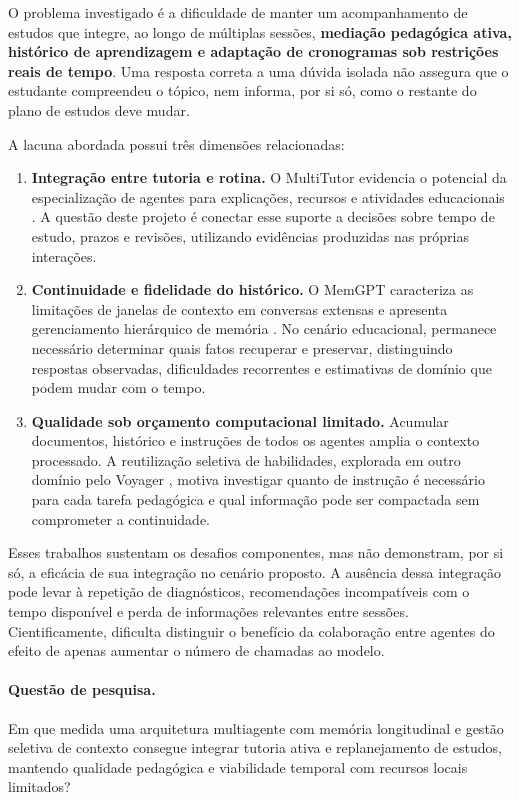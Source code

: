 \documentclass[12pt]{article}
\begin{document}
O problema investigado é a dificuldade de manter um acompanhamento de estudos que integre, ao longo de múltiplas sessões, \textbf{mediação pedagógica ativa, histórico de aprendizagem e adaptação de cronogramas sob restrições reais de tempo}. Uma resposta correta a uma dúvida isolada não assegura que o estudante compreendeu o tópico, nem informa, por si só, como o restante do plano de estudos deve mudar.

A lacuna abordada possui três dimensões relacionadas:
\begin{enumerate}
    \item \textbf{Integração entre tutoria e rotina.} O MultiTutor evidencia o potencial da especialização de agentes para explicações, recursos e atividades educacionais \citep{sun2025multitutor}. A questão deste projeto é conectar esse suporte a decisões sobre tempo de estudo, prazos e revisões, utilizando evidências produzidas nas próprias interações.
    \item \textbf{Continuidade e fidelidade do histórico.} O MemGPT caracteriza as limitações de janelas de contexto em conversas extensas e apresenta gerenciamento hierárquico de memória \citep{packer2023memgpt}. No cenário educacional, permanece necessário determinar quais fatos recuperar e preservar, distinguindo respostas observadas, dificuldades recorrentes e estimativas de domínio que podem mudar com o tempo.
    \item \textbf{Qualidade sob orçamento computacional limitado.} Acumular documentos, histórico e instruções de todos os agentes amplia o contexto processado. A reutilização seletiva de habilidades, explorada em outro domínio pelo Voyager \citep{wang2023voyager}, motiva investigar quanto de instrução é necessário para cada tarefa pedagógica e qual informação pode ser compactada sem comprometer a continuidade.
\end{enumerate}

Esses trabalhos sustentam os desafios componentes, mas não demonstram, por si só, a eficácia de sua integração no cenário proposto. A ausência dessa integração pode levar à repetição de diagnósticos, recomendações incompatíveis com o tempo disponível e perda de informações relevantes entre sessões. Cientificamente, dificulta distinguir o benefício da colaboração entre agentes do efeito de apenas aumentar o número de chamadas ao modelo.

\paragraph{Questão de pesquisa.}
Em que medida uma arquitetura multiagente com memória longitudinal e gestão seletiva de contexto consegue integrar tutoria ativa e replanejamento de estudos, mantendo qualidade pedagógica e viabilidade temporal com recursos locais limitados?
\end{document}
